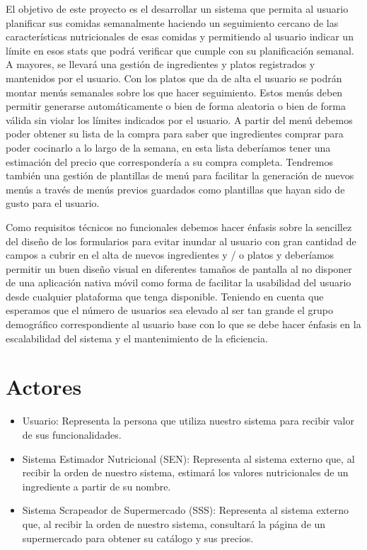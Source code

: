 \documentclass[12pt, a4paper, twoside]{book}
\begin{document}
	El objetivo de este proyecto es el desarrollar un sistema que permita al usuario planificar sus comidas semanalmente haciendo un seguimiento cercano de las características nutricionales de esas comidas y permitiendo al usuario indicar un límite en esos stats que podrá verificar que cumple con su planificación semanal.
	A mayores, se llevará una gestión de ingredientes y platos registrados y mantenidos por el usuario. Con los platos que da de alta el usuario se podrán montar menús semanales sobre los que hacer seguimiento.
	Estos menús deben permitir generarse automáticamente o bien de forma aleatoria o bien de forma válida sin violar los límites indicados por el usuario. A partir del menú debemos poder obtener su lista de la compra para saber que ingredientes comprar para poder cocinarlo a lo largo de la semana, en esta lista deberíamos tener una estimación del precio que correspondería a su compra completa.
	Tendremos también una gestión de plantillas de menú para facilitar la generación de nuevos menús a través de menús previos guardados como plantillas que hayan sido de gusto para el usuario.
	
	Como requisitos técnicos no funcionales debemos hacer énfasis sobre la sencillez del diseño de los formularios para evitar inundar al usuario con gran cantidad de campos a cubrir en el alta de nuevos ingredientes y / o platos y deberíamos permitir un buen diseño visual en diferentes tamaños de pantalla al no disponer de una aplicación nativa móvil como forma de facilitar la usabilidad del usuario desde cualquier plataforma que tenga disponible. Teniendo en cuenta que esperamos que el número de usuarios sea elevado al ser tan grande el grupo demográfico correspondiente al usuario base con lo que se debe hacer énfasis en la escalabilidad del sistema y el mantenimiento de la eficiencia.
	\section{Actores}
	\begin{itemize}
		\item Usuario: Representa la persona que utiliza nuestro sistema para recibir valor de sus funcionalidades.
		\item Sistema Estimador Nutricional (SEN): Representa al sistema externo que, al recibir la orden de nuestro sistema, estimará los valores nutricionales de un ingrediente a partir de su nombre.
		\item Sistema Scrapeador de Supermercado (SSS): Representa al sistema externo que, al recibir la orden de nuestro sistema, consultará la página de un supermercado para obtener su catálogo y sus precios.
	\end{itemize}
\end{document}
